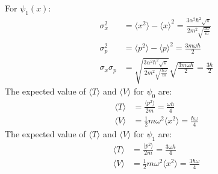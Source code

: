 \documentclass{article}
\begin{document}
For \(\psi_1(x)\):
\begin{align*}
	\sigma_x^2        & = \langle x^2 \rangle - \langle x \rangle^2 = \frac{3 \alpha^2 \hbar^2 \sqrt{\pi}}{2m^2 \sqrt{\frac{h \omega}{m}}}                  \\
	\sigma_p^2        & = \langle p^2 \rangle - \langle p \rangle^2 = \frac{3 m \omega \hbar}{2}                                                            \\
	\sigma_x \sigma_p & = \sqrt{\frac{3 \alpha^2 \hbar^2 \sqrt{\pi}}{2m^2 \sqrt{\frac{h \omega}{m}}}} \sqrt{\frac{3 m \omega \hbar}{2}} = \frac{3 \hbar}{2}
\end{align*}
The expected value of \(\langle T \rangle\) and \(\langle V \rangle\) for \(\psi_0\) are:
\begin{align*}
	\langle T \rangle & = \frac{\langle p^2 \rangle}{2m} = \frac{ \omega \hbar}{4}            \\
	\langle V \rangle & = \frac{1}{2} m \omega^2 \langle x^2 \rangle = \frac{\hbar \omega}{4}
\end{align*}
The expected value of \(\langle T \rangle\) and \(\langle V \rangle\) for \(\psi_1\) are:
\begin{align*}
	\langle T \rangle & = \frac{\langle p^2 \rangle}{2m} = \frac{3 \omega \hbar}{4}             \\
	\langle V \rangle & = \frac{1}{2} m \omega^2 \langle x^2 \rangle = \frac{3 \hbar \omega}{4}
\end{align*}
\end{document}
